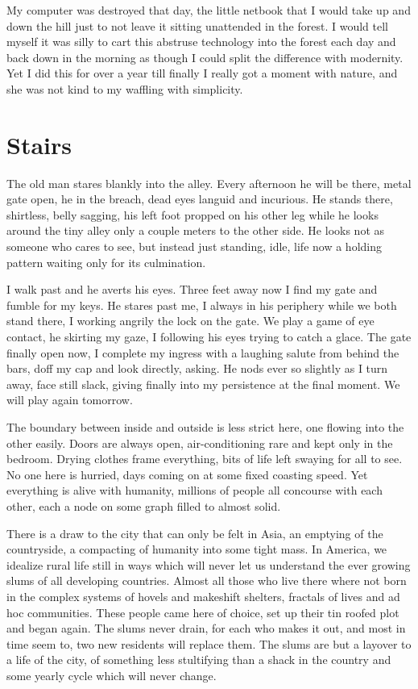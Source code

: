 \documentclass[ebook, 10pt, openright, onecolumn]{memoir}
\begin{document}
My computer was destroyed that day, the little netbook that I would take up and
down the hill just to not leave it sitting unattended in the forest.  I would
tell myself it was silly to cart this abstruse technology into the forest each
day and back down in the morning as though I could split the difference with
modernity.  Yet I did this for over a year till finally I really got a moment
with nature, and she was not kind to my waffling with simplicity.  

\chapter{Stairs}
\label{cha:stairs}

The old man stares blankly into the alley. Every afternoon he will be there,
metal gate open, he in the breach, dead eyes languid and incurious.  He stands
there, shirtless, belly sagging, his left foot propped on his other leg while he
looks around the tiny alley only a couple meters to the other side.  He looks
not as someone who cares to see, but instead just standing, idle, life now a
holding pattern waiting only for its culmination.

I walk past and he averts his eyes.  Three feet away now I find my gate and
fumble for my keys.  He stares past me, I always in his periphery while we both
stand there, I working angrily the lock on the gate.  We play a game of eye
contact, he skirting my gaze, I following his eyes trying to catch a glace.  The
gate finally open now, I complete my ingress with a laughing salute from behind the
bars, doff my cap and look directly, asking.  He nods ever so slightly as I turn
away, face still slack, giving finally into my persistence at the final
moment.  We will play again tomorrow. 

The boundary between inside and outside is less strict here, one flowing into
the other easily.  Doors are always open, air-conditioning rare and kept only in
the bedroom.  Drying clothes frame everything, bits of life left swaying for all
to see.  No one here is hurried, days coming on at some fixed coasting
speed. Yet everything is alive with humanity, millions of people all 
concourse with each other, each a node on some graph filled to almost solid.

There is a draw to the city that can only be felt in Asia, an emptying of the
countryside, a compacting of humanity into some tight mass.  In America, we
idealize rural life still in ways which will never let us understand the ever
growing slums of all developing countries.  Almost all those who live there
where not born in the complex systems of hovels and makeshift shelters, 
fractals of lives and ad hoc communities.  These people came here of choice, set
up their tin roofed plot and began again.  The slums never drain, for each who
makes it out, and most in time seem to, two new residents will replace them.
The slums are but a layover to a life of the city, of something less stultifying
than a shack in the country and some yearly cycle which will never change.
\end{document}
